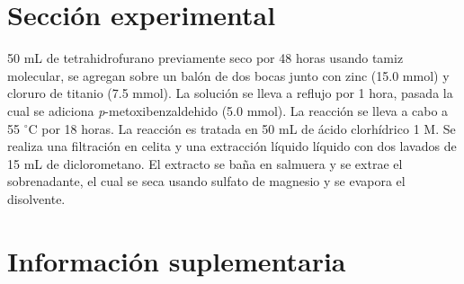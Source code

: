 \documentclass[fleqn,11pt]{SelfArx}
\begin{document}
\section{Secci\'on experimental}
50 mL de tetrahidrofurano previamente seco por 48 horas usando tamiz molecular, se agregan sobre un bal\'on de dos bocas junto con zinc (15.0 mmol) y cloruro de titanio (7.5 mmol). La soluci\'on se lleva a reflujo por 1 hora, pasada la cual se adiciona \textit{p}-metoxibenzaldehido (5.0 mmol). La reacci\'on se lleva a cabo a 55 $^\circ$C por 18 horas. La reacci\'on es tratada en 50 mL de \'acido clorh\'idrico 1 M. Se realiza una filtraci\'on en celita y una extracci\'on l\'iquido l\'iquido con dos lavados de 15 mL de diclorometano. El extracto se baña en salmuera y se extrae el sobrenadante, el cual se seca usando sulfato de magnesio y se evapora el disolvente.


\newpage
\onecolumn
\section{Informaci\'on suplementaria}\label{sec: complementaria}
\end{document}
